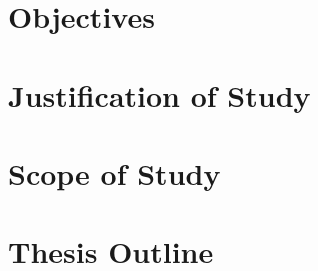\section{Objectives}



\section{Justification of Study}



\section{Scope of Study}



\section{Thesis Outline}


